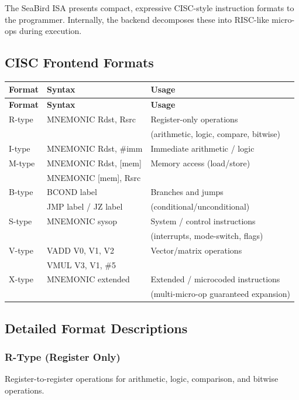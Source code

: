 \documentclass[11pt]{article}
\begin{document}
The SeaBird ISA presents compact, expressive CISC-style instruction formats to the programmer. Internally, the backend decomposes these into RISC-like micro-ops during execution.

\subsection{CISC Frontend Formats}

\begin{longtable}{@{}lll@{}}
\toprule
\textbf{Format} & \textbf{Syntax} & \textbf{Usage} \\ \midrule
\endfirsthead
\toprule
\textbf{Format} & \textbf{Syntax} & \textbf{Usage} \\ \midrule
\endhead
R-type & MNEMONIC Rdst, Rsrc & Register-only operations \\
 &  & (arithmetic, logic, compare, bitwise) \\
I-type & MNEMONIC Rdst, \#imm & Immediate arithmetic / logic \\
M-type & MNEMONIC Rdst, [mem] & Memory access (load/store) \\
 & MNEMONIC [mem], Rsrc & \\
B-type & BCOND label & Branches and jumps \\
 & JMP label / JZ label & (conditional/unconditional) \\
S-type & MNEMONIC sysop & System / control instructions \\
 &  & (interrupts, mode-switch, flags) \\
V-type & VADD V0, V1, V2 & Vector/matrix operations \\
 & VMUL V3, V1, \#5 & \\
X-type & MNEMONIC extended & Extended / microcoded instructions \\
 &  & (multi-micro-op guaranteed expansion) \\ \bottomrule
\end{longtable}

\subsection{Detailed Format Descriptions}

\subsubsection{R-Type (Register Only)}

Register-to-register operations for arithmetic, logic, comparison, and bitwise operations.
\end{document}
